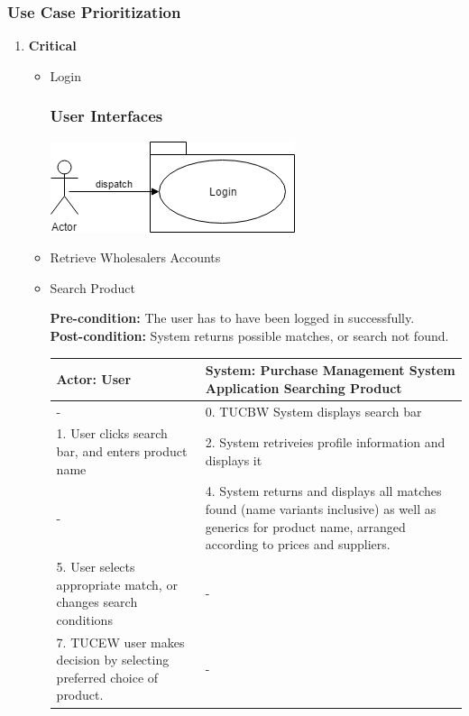\documentclass[a4paper,10pt]{article}
\begin{document}
{	
	\subsubsection{Use Case Prioritization} 
		\begin{enumerate} 
		\item \textbf{Critical} 
			\begin{itemize} 
				\item Login
                 \subsubsection{User Interfaces}
		 \includegraphics[scale=0.62]{login.png}

				\item Retrieve Wholesalers Accounts 
				\item Search Product 
				
				\textbf{Pre-condition: } The user has to have been logged in successfully.  \\
				\textbf{Post-condition: }  System returns possible matches, or search not found. \\
				\begin{center}
				\begin{tabular}{ |p{8cm}|p{8cm}| }
				 \hline
  				\textbf{Actor:} User & \textbf{System: Purchase Management System Application} Searching Product \\
				 \hline
				 - & 0. TUCBW System displays search bar\\
				 \hline
				  1. User clicks search bar, and enters product name & 2. System retriveies profile information and displays it\\
				 \hline
				 - & 4. System returns and displays all matches found (name variants inclusive) as well as  generics for product name, arranged according to prices and suppliers. \\
				 \hline
				5. User selects appropriate match, or changes search conditions & - \\
				 \hline
				7. TUCEW user makes decision by selecting preferred choice of product. & - \\
				\hline
				
				\end{tabular}
				\end{center}
				

\end{itemize}
\end{enumerate}}
\end{document}

